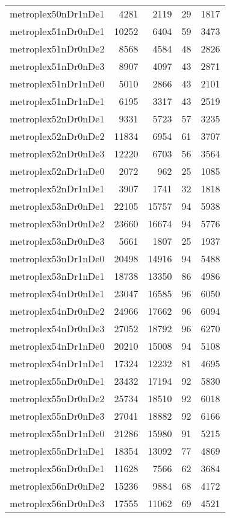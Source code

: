 \begin{longtable}{lrrrr}
metroplex50nDr1nDe1 & 4281 & 2119 & 29 & 1817 \\
metroplex51nDr0nDe1 & 10252 & 6404 & 59 & 3473 \\
metroplex51nDr0nDe2 & 8568 & 4584 & 48 & 2826 \\
metroplex51nDr0nDe3 & 8907 & 4097 & 43 & 2871 \\
metroplex51nDr1nDe0 & 5010 & 2866 & 43 & 2101 \\
metroplex51nDr1nDe1 & 6195 & 3317 & 43 & 2519 \\
metroplex52nDr0nDe1 & 9331 & 5723 & 57 & 3235 \\
metroplex52nDr0nDe2 & 11834 & 6954 & 61 & 3707 \\
metroplex52nDr0nDe3 & 12220 & 6703 & 56 & 3564 \\
metroplex52nDr1nDe0 & 2072 & 962 & 25 & 1085 \\
metroplex52nDr1nDe1 & 3907 & 1741 & 32 & 1818 \\
metroplex53nDr0nDe1 & 22105 & 15757 & 94 & 5938 \\
metroplex53nDr0nDe2 & 23660 & 16674 & 94 & 5776 \\
metroplex53nDr0nDe3 & 5661 & 1807 & 25 & 1937 \\
metroplex53nDr1nDe0 & 20498 & 14916 & 94 & 5488 \\
metroplex53nDr1nDe1 & 18738 & 13350 & 86 & 4986 \\
metroplex54nDr0nDe1 & 23047 & 16585 & 96 & 6050 \\
metroplex54nDr0nDe2 & 24966 & 17662 & 96 & 6094 \\
metroplex54nDr0nDe3 & 27052 & 18792 & 96 & 6270 \\
metroplex54nDr1nDe0 & 20210 & 15008 & 94 & 5108 \\
metroplex54nDr1nDe1 & 17324 & 12232 & 81 & 4695 \\
metroplex55nDr0nDe1 & 23432 & 17194 & 92 & 5830 \\
metroplex55nDr0nDe2 & 25734 & 18510 & 92 & 6018 \\
metroplex55nDr0nDe3 & 27041 & 18882 & 92 & 6166 \\
metroplex55nDr1nDe0 & 21286 & 15980 & 91 & 5215 \\
metroplex55nDr1nDe1 & 18354 & 13092 & 77 & 4869 \\
metroplex56nDr0nDe1 & 11628 & 7566 & 62 & 3684 \\
metroplex56nDr0nDe2 & 15236 & 9884 & 68 & 4172 \\
metroplex56nDr0nDe3 & 17555 & 11062 & 69 & 4521 \\

\end{longtable}
